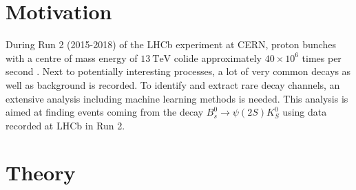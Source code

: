\section{Motivation}

During Run 2 (2015-2018) of the LHCb experiment at CERN, proton bunches with a centre of mass energy of $\qty{13}{\tera\electronvolt}$ colide approximately $40 \times 10^6$ times per second \cite{LHCb_MVA}.
Next to potentially interesting processes, a lot of very common decays as well as background is recorded. To identify and extract rare decay channels, an extensive analysis including machine learning methods is needed.
This analysis is aimed at finding events coming from the decay $B_s^0 \to \psi (2S)K_S^0$ using data recorded at LHCb in Run 2. 

\section{Theory}
\label{sec:Theorie}

